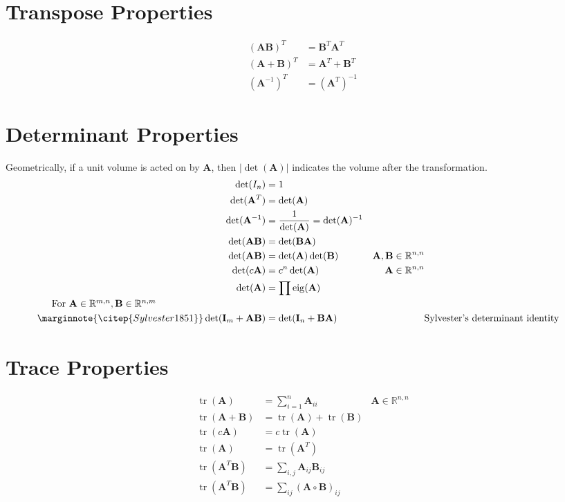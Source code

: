 \documentclass{book}
\newcommand{\mA}{\mathbf{A}}
\newcommand{\mB}{\mathbf{B}}
\newcommand{\mI}{\mathbf{I}}
\DeclareMathOperator{\eig}{eig}
\DeclareMathOperator{\trace}{tr}
\newcommand{\sRnm}{\mathbb{R}^{n,m}}
\newcommand{\sRmn}{\mathbb{R}^{m,n}}
\newcommand{\sRnn}{\mathbb{R}^{n,n}}
\newcommand{\eqcite}[1]{\marginnote{\citep{#1}}}
\begin{document}



\tableofcontents















\chapter{Transpose Properties}

\begin{align}
(\mA\mB)^T   &= \mB^T\mA^T    \\
(\mA+\mB)^T  &= \mA^T+\mB^T   \\
(\mA^{-1})^T &= (\mA^T)^{-1}
\end{align}


\chapter{Determinant Properties}

Geometrically, if a unit volume is acted on by $\mA$, then $|\det(\mA)|$ indicates the volume after the transformation.
\begin{align}
\det(I_n)          &= 1                                   \\
\det(\mA^T)        &= \det(\mA)                           \\
\det(\mA^{-1})     &= \frac{1}{\det(\mA)}=\det(\mA)^{-1}  \\
\det(\mA\mB)       &= \det(\mB\mA)                        \\
\det(\mA\mB)       &= \det(\mA)\det(\mB)                  &\mA,\mB\in\sRnn \\
\det(c\mA)         &= c^n\det(\mA)                        &\mA\in\sRnn     \\
\det(\mA)          &= \prod \eig(\mA)                     \\
\noalign{For $\mA\in\sRmn, \mB\in\sRnm$}
\eqcite{Sylvester1851}
\det(\mI_m+\mA\mB) &= \det(\mI_n+\mB\mA) & & \textrm{Sylvester's determinant identity}
\end{align}


\chapter{Trace Properties}
\begin{align}
\trace(\mA)      &=\sum_{i=1}^n \mA_{ii}   & \mA\in\sRnn \\
\trace(\mA+\mB)  &=\trace(\mA)+\trace(\mB)     \\
\trace(c\mA)     &=c\trace(\mA)                \\
\trace(\mA)      &=\trace(\mA^T)               \\
\trace(\mA^T\mB) &=\sum_{i,j} \mA_{ij}\mB_{ij} \\  %
\trace(\mA^T\mB) &=\sum_{ij} (\mA\circ\mB)_{ij}    %
\end{align}
\end{document}
